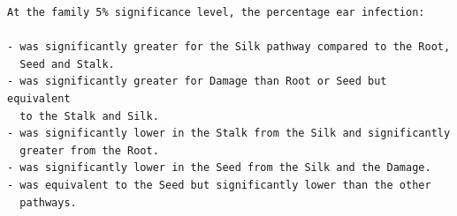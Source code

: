 \documentclass[a4paper, 10pt, fleqn, twosided]{memoir}
\begin{document}
\begin{tcolorbox}[title = Exercise 5 interpretation]
\begin{verbatim}
At the family 5% significance level, the percentage ear infection:

- was significantly greater for the Silk pathway compared to the Root,
  Seed and Stalk.
- was significantly greater for Damage than Root or Seed but equivalent
  to the Stalk and Silk.
- was significantly lower in the Stalk from the Silk and significantly
  greater from the Root.
- was significantly lower in the Seed from the Silk and the Damage.
- was equivalent to the Seed but significantly lower than the other
  pathways.
\end{verbatim}
\end{tcolorbox}
\end{document}
